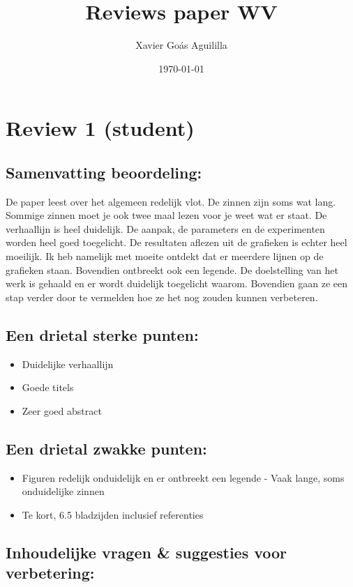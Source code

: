 \documentclass[11pt]{article}
\author{Xavier Goás Aguililla}
\date{\today}
\title{Reviews paper WV}
\begin{document}
\maketitle
\section{Review 1 (student)}

\subsection{Samenvatting beoordeling:}
De paper leest over het algemeen redelijk vlot. De zinnen zijn soms wat lang.
Sommige zinnen moet je ook twee maal lezen voor je weet wat er staat. De
verhaallijn is heel duidelijk. De aanpak, de parameters en de experimenten
worden heel goed toegelicht. De resultaten aflezen uit de grafieken is echter
heel moeilijk. Ik heb namelijk met moeite ontdekt dat er meerdere lijnen op de
grafieken staan. Bovendien ontbreekt ook een legende. De doelstelling van het
werk is gehaald en er wordt duidelijk toegelicht waarom. Bovendien gaan ze een
stap verder door te vermelden hoe ze het nog zouden kunnen verbeteren.

\subsection{Een drietal sterke punten:}

\begin{itemize}
\item Duidelijke verhaallijn
\item Goede titels
\item Zeer goed abstract
\end{itemize}

\subsection{Een drietal zwakke punten:}
\begin{itemize}
\item Figuren redelijk onduidelijk en er ontbreekt een legende - Vaak lange, soms onduidelijke zinnen

\item Te kort, 6.5 bladzijden inclusief referenties
\end{itemize}

\subsection{Inhoudelijke vragen \& suggesties voor verbetering:}
\end{document}

